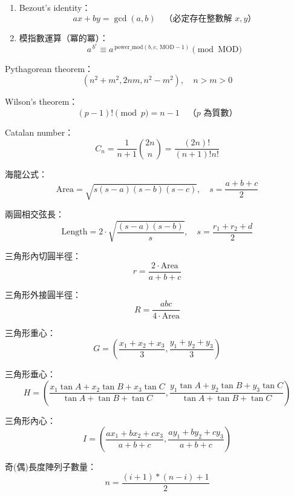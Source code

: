 \begin{enumerate}
\subsubsection{數論公式}
\item Bezout's identity：
\[
ax + by = \gcd(a, b) \quad \text{（必定存在整數解 $x, y$）}
\]

\item 模指數運算（冪的冪）：
\[
a^{\,b^c} \equiv a^{\,\text{power\_mod}(b, c, \, \text{MOD}-1)} \pmod{\text{MOD}}
\]
\end{enumerate}

\item Pythagorean theorem：
\[
(n^2 + m^2, 2nm, n^2 - m^2), \quad n > m > 0
\]

\item Wilson's theorem：
\[
(p-1)! \pmod{p} = n-1 \quad \text{（$p$ 為質數）}
\]

\item Catalan number：
\[
C_n = \frac{1}{n+1} \binom{2n}{
n} = \frac{(2n)!}{(n+1)!n!}
\]

\item 海龍公式：
\[
\text{Area} = \sqrt{s(s-a)(s-b)(s-c)}, \quad s = \frac{a+b+c}{2}
\]

\item 兩圓相交弦長：
\[
\text{Length} = 2 \cdot \sqrt{\frac{(s-a)(s-b)}{s}}, \quad s = \frac{r_1 + r_2 + d}{2}
\]

\item 三角形內切圓半徑：
\[
r = \frac{2 \cdot \text{Area}}{a + b + c}
\]

\item 三角形外接圓半徑：
\[
R = \frac{abc}{4 \cdot \text{Area}}
\]

\item 三角形重心：
\[
G = \left(\frac{x_1 + x_2 + x_3}{3}, \frac{y_1 + y_2 + y_3}{3}\right)
\]

\item 三角形垂心：
\[
H = \left(\frac{x_1 \tan A + x_2 \tan B + x_3 \tan C}{\tan A + \tan B + \tan C}, \frac{y_1 \tan A + y_2 \tan B + y_3 \tan C}{\tan A + \tan B + \tan C}\right)
\]

\item 三角形內心：
\[
I = \left(\frac{a x_1 + b x_2 + c x_3}{a + b + c}, \frac{a y_1 + b y_2 + c y_3}{a + b + c}\right)
\]

\item 奇(偶)長度陣列子數量：
\[
n = \frac{(i + 1) * (n - i) + 1}{2}
\]

%